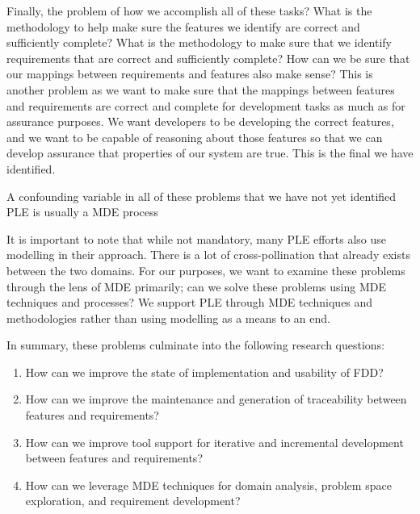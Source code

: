 Finally, the problem of how we accomplish all of these tasks? What is the methodology to help make sure the features we identify are correct and sufficiently complete? What is the methodology to make sure that we identify requirements that are correct and sufficiently complete? How can we be sure that our mappings between requirements and features also make sense? This is another problem as we want to make sure that the mappings between features and requirements are correct and complete for development tasks as much as for assurance purposes. We want developers to be developing the correct features, and we want to be capable of reasoning about those features so that we can develop assurance that properties of our system are true. This is the final we have identified.

A confounding variable in all of these problems that we have not yet identified \ac{PLE} is usually a \ac{MDE} process

It is important to note that while not mandatory, many \ac{PLE} efforts also use modelling in their approach. There is a lot of cross-pollination that already exists between the two domains. For our purposes, we want to examine these problems through the lens of \ac{MDE} primarily; can we solve these problems using \ac{MDE} techniques and processes? We support \ac{PLE} through \ac{MDE} techniques and methodologies rather than using modelling as a means to an end.

In summary, these problems culminate into the following research questions:
\begin{enumerate}[label=\textbf{RQ.\arabic*}]
	\item \label{RQ1} How can we improve the state of implementation and usability of \ac{FDD}?
	\item \label{RQ2} How can we improve the maintenance and generation of traceability between features and requirements?
	\item \label{RQ3} How can we improve tool support for iterative and incremental development between features and requirements?
	\item \label{RQ4} How can we leverage \ac{MDE} techniques for domain analysis, problem space exploration, and requirement development?
\end{enumerate}


